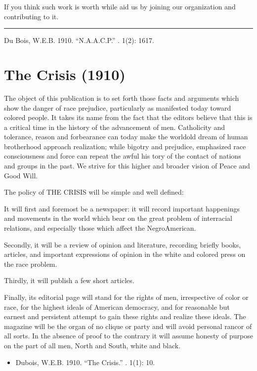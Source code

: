 \documentclass[letterpaper,10pt,english]{jupyterBook}
\begin{document}
\sphinxAtStartPar
If you think such work is worth while aid us by joining our organization and contributing to it.


\bigskip\hrule\bigskip


\sphinxAtStartPar
{} Du Bois, W.E.B. 1910. “N.A.A.C.P.”  . 1(2): 16\sphinxhyphen{}17.


\section{The Crisis (1910)}
\label{\detokenize{Volumes/01/01/TheCrisis:the-crisis-1910}}\label{\detokenize{Volumes/01/01/TheCrisis::doc}}
\sphinxAtStartPar
The object of this publication is to set forth those facts and arguments which show the danger of race prejudice, particularly as manifested to\sphinxhyphen{}day toward colored people. It takes its name from the fact that the editors believe that this is a critical time in the history of the advancement of men. Catholicity and tolerance, reason and forbearance can to\sphinxhyphen{}day make the world\sphinxhyphen{}old dream of human brotherhood approach realization; while bigotry and prejudice, emphasized race consciousness and force can repeat the awful his tory of the contact of nations and groups in the past. We strive for this higher and broader vision of Peace and Good Will.

\sphinxAtStartPar
The policy of THE CRISIS will be simple and well defined:

\sphinxAtStartPar
It will first and foremost be a newspaper: it will record important happenings and movements in the world which bear on the great problem of inter\sphinxhyphen{}racial relations, and especially those which affect the Negro\sphinxhyphen{}American.

\sphinxAtStartPar
Secondly, it will be a review of opinion and literature, recording briefly books, articles, and important expressions of opinion in the white and colored press on the race problem.

\sphinxAtStartPar
Thirdly, it will publish a few short articles.

\sphinxAtStartPar
Finally, its editorial page will stand for the rights of men, irrespective of color or race, for the highest ideals of American democracy, and for reasonable but earnest and persistent attempt to gain these rights and realize these ideals. The magazine will be the organ of no clique or party and will avoid personal rancor of all sorts. In the absence of proof to the contrary it will assume honesty of purpose on the part of all men, North and South, white and black.
\begin{itemize}
\item {} 
\sphinxAtStartPar
Dubois, W.E.B. 1910. “The Crisis.” . 1(1): 10.

\end{itemize}
\end{document}
